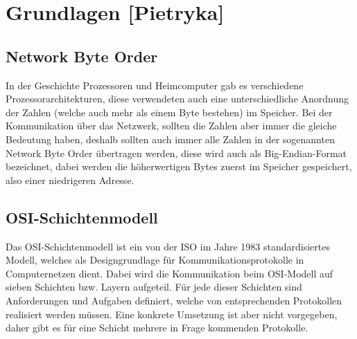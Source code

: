 \documentclass[a4paper,14pt,headsepline]{scrartcl}
\begin{document}
\begin{figure}[h]
\begin{center}
\end{center}
\end{figure}

\newpage

\section{Grundlagen [Pietryka]}
\subsection{Network Byte Order}
In der Geschichte Prozessoren und Heimcomputer gab es verschiedene Prozessorarchitekturen, diese verwendeten auch eine unterschiedliche Anordnung der Zahlen (welche auch mehr als einem Byte bestehen) im Speicher. Bei  der Kommunikation über das Netzwerk, sollten die Zahlen aber immer die gleiche Bedeutung haben, deshalb sollten auch immer alle Zahlen in der sogenannten Network Byte Order übertragen werden, diese wird auch als Big-Endian-Format bezeichnet, dabei werden die höherwertigen Bytes zuerst im Speicher gespeichert, also einer niedrigeren Adresse.

\subsection{OSI-Schichtenmodell}
Das OSI-Schichtenmodell ist ein von der ISO im Jahre 1983 standardisiertes Modell, welches als Designgrundlage für Kommunikationsprotokolle in Computernetzen dient. Dabei wird die Kommunikation beim OSI-Modell auf sieben Schichten bzw. Layern aufgeteil. Für jede dieser Schichten sind Anforderungen und Aufgaben definiert, welche von entsprechenden Protokollen realisiert werden müssen. Eine konkrete Umsetzung ist aber nicht vorgegeben, daher gibt es für eine Schicht mehrere in Frage kommenden Protokolle.
\end{document}
